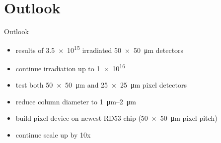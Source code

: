 \section{Outlook}
\begin{frame}{Outlook}

	\begin{minipage}[c][5cm]{\textwidth}
		\begin{itemize}\itemfill
			\item results of \SI{3.5e15}{\ncm} irradiated \SI{50x50}{\micro\meter} detectors
			\item continue irradiation up to \SI{1e16}{\ncm}
			\item test both \SI{50x50}{\micro\meter} and \SI{25x25}{\micro\meter} pixel detectors
			\item reduce column diameter to \SIrange{1}{2}{\micro\meter}
			\item build pixel device on newest RD53 chip (\SI{50x50}{\micro\meter} pixel pitch)
			\item continue scale up by 10x
		\end{itemize}
	\end{minipage}
	
\end{frame}
